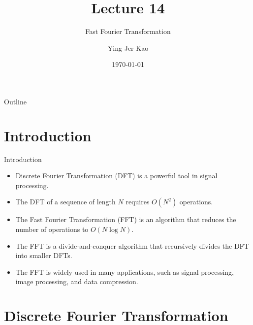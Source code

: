 \documentclass{beamer}
\title[Fast Fourier Transformation] %
{Lecture 14}
\subtitle
{Fast Fourier Transformation} %
\author[Ying-Jer Kao] %
{Ying-Jer Kao}
\institute[National Taiwan University] %
{
  Department of Physics\\
 National Taiwan University
  }
\date[Numerical Analysis and Programming] %
{\today}
\begin{document}
\begin{frame}
  \titlepage
\end{frame}

\begin{frame}{Outline}
  \tableofcontents
\end{frame}



\section[Introduction]{Introduction}
\begin{frame}{Introduction}
\begin{itemize}
    \item Discrete Fourier Transformation (DFT) is a powerful tool in signal processing.
    \item The DFT of a sequence of length $N$ requires $O(N^2)$ operations.
    \item The Fast Fourier Transformation (FFT) is an algorithm that reduces the number of operations to $O(N\log N)$.
    \item The FFT is a divide-and-conquer algorithm that recursively divides the DFT into smaller DFTs.
    \item The FFT is widely used in many applications, such as signal processing, image processing, and data compression.
    
\end{itemize}
\end{frame}
\section{Discrete Fourier Transformation}
\end{document}
